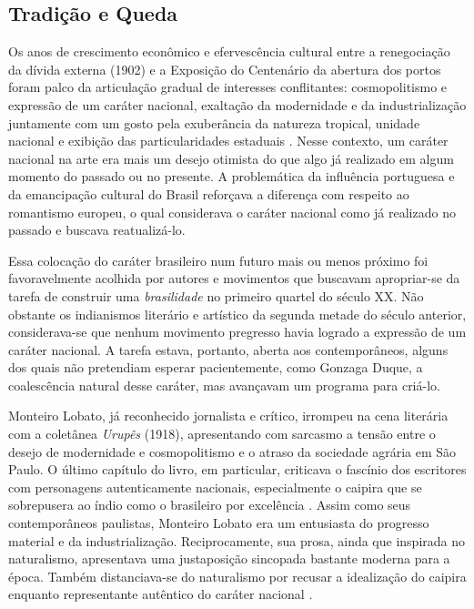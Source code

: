 \hypertarget{tradiuxe7uxe3o-e-queda}{%
\subsection{Tradição e Queda}\label{tradiuxe7uxe3o-e-queda}}

Os anos de crescimento econômico e efervescência cultural entre a
renegociação da dívida externa (1902) e a Exposição do Centenário da
abertura dos portos foram palco da articulação gradual de interesses
conflitantes: cosmopolitismo e expressão de um caráter nacional,
exaltação da modernidade e da industrialização juntamente com um gosto
pela exuberância da natureza tropical, unidade nacional e exibição das
particularidades estaduais \autocite{pereira:2011exposicao}. Nesse
contexto, um caráter nacional na arte era mais um desejo otimista do que
algo já realizado em algum momento do passado ou no presente. A
problemática da influência portuguesa e da emancipação cultural do
Brasil reforçava a diferença com respeito ao romantismo europeu, o qual
considerava o caráter nacional como já realizado no passado e buscava
reatualizá-lo.

Essa colocação do caráter brasileiro num futuro mais ou menos próximo
foi favoravelmente acolhida por autores e movimentos que buscavam
apropriar-se da tarefa de construir uma \emph{brasilidade} no primeiro
quartel do século XX. Não obstante os indianismos literário e artístico
da segunda metade do século anterior, considerava-se que nenhum
movimento pregresso havia logrado a expressão de um caráter nacional. A
tarefa estava, portanto, aberta aos contemporâneos, alguns dos quais não
pretendiam esperar pacientemente, como Gonzaga Duque, a coalescência
natural desse caráter, mas avançavam um programa para criá-lo.

Monteiro Lobato, já reconhecido jornalista e crítico, irrompeu na cena
literária com a coletânea \emph{Urupês} (1918), apresentando com
sarcasmo a tensão entre o desejo de modernidade e cosmopolitismo e o
atraso da sociedade agrária em São Paulo. O último capítulo do livro, em
particular, criticava o fascínio dos escritores com personagens
autenticamente nacionais, especialmente o caipira que se sobrepusera ao
índio como o brasileiro por excelência
\autocite[p.~208--209]{monteirolobato:1944urupes}. Assim como seus
contemporâneos paulistas, Monteiro Lobato era um entusiasta do progresso
material e da industrialização. Reciprocamente, sua prosa, ainda que
inspirada no naturalismo, apresentava uma justaposição sincopada
bastante moderna para a época. Também distanciava-se do naturalismo por
recusar a idealização do caipira enquanto representante autêntico do
caráter nacional \autocite[p.~303]{silva:2013modernidade}.

